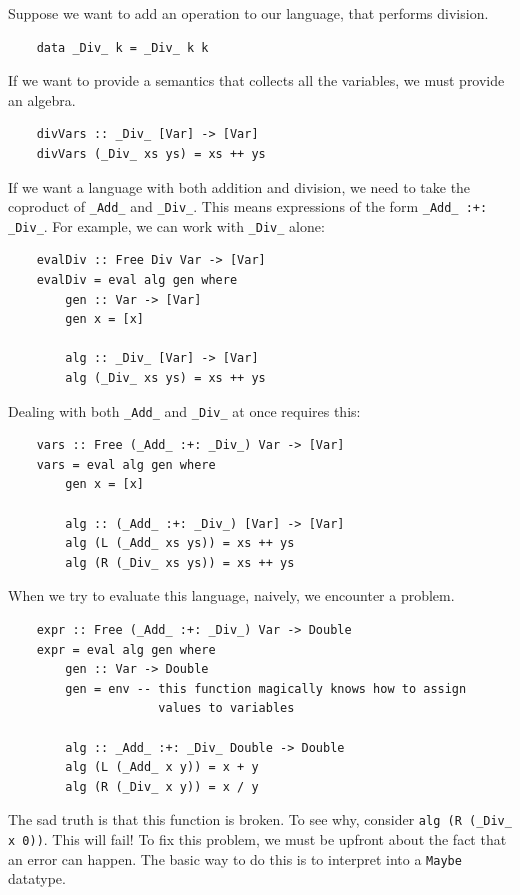 \documentclass[a4paper,12pt]{article}
\theoremstyle{remark}
\begin{document}
Suppose we want to add an operation to our language, that performs division.

\begin{lstlisting}
    data _Div_ k = _Div_ k k  \end{lstlisting}

If we want to provide a semantics that collects all the variables, we must provide
an algebra.

\begin{lstlisting}
    divVars :: _Div_ [Var] -> [Var]
    divVars (_Div_ xs ys) = xs ++ ys  \end{lstlisting}

If we want a language with both addition and division, we need to take the coproduct of
\lstinline{_Add_} and \lstinline{_Div_}. This means expressions of the form \lstinline{_Add_ :+: _Div_}. For example, we can work with \lstinline{_Div_} alone:

\begin{lstlisting}
    evalDiv :: Free Div Var -> [Var]
    evalDiv = eval alg gen where
        gen :: Var -> [Var]
        gen x = [x]

        alg :: _Div_ [Var] -> [Var]
        alg (_Div_ xs ys) = xs ++ ys  \end{lstlisting}

Dealing with both \lstinline{_Add_} and \lstinline{_Div_} at once requires this:

\begin{lstlisting}
    vars :: Free (_Add_ :+: _Div_) Var -> [Var]
    vars = eval alg gen where
        gen x = [x]

        alg :: (_Add_ :+: _Div_) [Var] -> [Var]
        alg (L (_Add_ xs ys)) = xs ++ ys
        alg (R (_Div_ xs ys)) = xs ++ ys  \end{lstlisting}

When we try to evaluate this language, naively, we encounter a problem.

\begin{lstlisting}
    expr :: Free (_Add_ :+: _Div_) Var -> Double
    expr = eval alg gen where
        gen :: Var -> Double
        gen = env -- this function magically knows how to assign
                     values to variables

        alg :: _Add_ :+: _Div_ Double -> Double
        alg (L (_Add_ x y)) = x + y
        alg (R (_Div_ x y)) = x / y  \end{lstlisting}

The sad truth is that this function is broken. To see why, consider
\lstinline{alg (R (_Div_ x 0))}. This will fail! To fix this problem, we must be upfront about the
fact that an error can happen. The basic way to do this is to interpret into a
\lstinline{Maybe} datatype.
\end{document}
